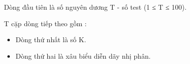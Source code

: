 Dòng đầu tiên là số nguyên dương T - số test (1 ≤ T ≤ 100).

T cặp dòng tiếp theo gồm :
\begin{itemize}
	\item Dòng thứ nhất là số K.
	\item Dòng thứ hai là xâu biểu diễn dãy nhị phân.
\end{itemize}

\